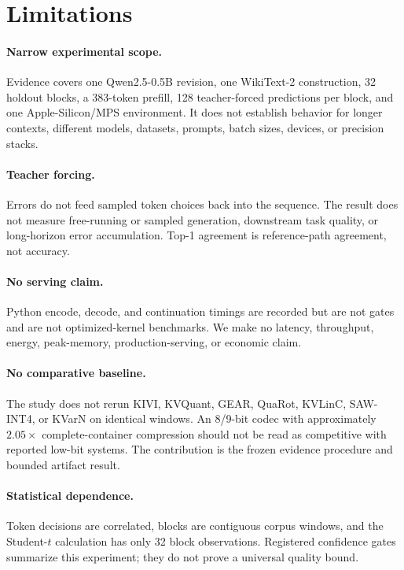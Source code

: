 \documentclass[10pt,twocolumn]{article}
\begin{document}
\section{Limitations}
\label{sec:limitations}

\paragraph{Narrow experimental scope.}
Evidence covers one Qwen2.5-0.5B revision, one WikiText-2 construction, 32
holdout blocks, a 383-token prefill, 128 teacher-forced predictions per block,
and one Apple-Silicon/MPS environment. It does not establish behavior for
longer contexts, different models, datasets, prompts, batch sizes, devices, or
precision stacks.

\paragraph{Teacher forcing.}
Errors do not feed sampled token choices back into the sequence. The result
does not measure free-running or sampled generation, downstream task quality,
or long-horizon error accumulation. Top-1 agreement is reference-path
agreement, not accuracy.

\paragraph{No serving claim.}
Python encode, decode, and continuation timings are recorded but are not gates
and are not optimized-kernel benchmarks. We make no latency, throughput,
energy, peak-memory, production-serving, or economic claim.

\paragraph{No comparative baseline.}
The study does not rerun KIVI, KVQuant, GEAR, QuaRot, KVLinC, SAW-INT4, or
KVarN on identical windows. An 8/9-bit codec with approximately $2.05\times$
complete-container compression should not be read as competitive with reported
low-bit systems. The contribution is the frozen evidence procedure and bounded
artifact result.

\paragraph{Statistical dependence.}
Token decisions are correlated, blocks are contiguous corpus windows, and the
Student-$t$ calculation has only 32 block observations. Registered confidence
gates summarize this experiment; they do not prove a universal quality bound.
\end{document}

